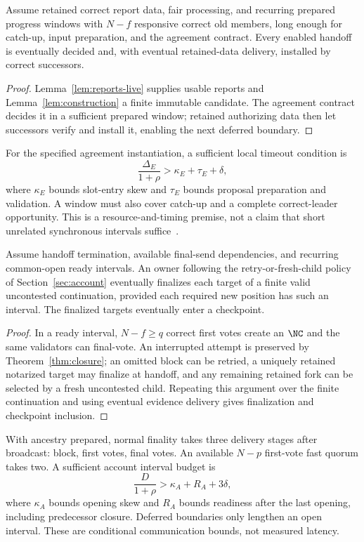 \begin{theorem}
\label{thm:handoff-live}
Assume retained correct report data, fair processing, and recurring prepared progress windows with $N-f$ responsive correct old members, long enough for catch-up, input preparation, and the agreement contract. Every enabled handoff is eventually decided and, with eventual retained-data delivery, installed by correct successors.
\end{theorem}
\begin{proof}
Lemma~\ref{lem:reports-live} supplies usable reports and Lemma~\ref{lem:construction} a finite immutable candidate. The agreement contract decides it in a sufficient prepared window; retained authorizing data then let successors verify and install it, enabling the next deferred boundary.
\end{proof}

For the specified agreement instantiation, a sufficient local timeout condition is
\begin{equation}
\frac{\Delta_E}{1+\rho}>\kappa_E+\tau_E+\delta,\label{eq:election-window}
\end{equation}
where $\kappa_E$ bounds slot-entry skew and $\tau_E$ bounds proposal preparation and validation. A window must also cover catch-up and a complete correct-leader opportunity. This is a resource-and-timing premise, not a claim that short unrelated synchronous intervals suffice~\cite{dls}.

\begin{theorem}
\label{thm:account-live}
Assume handoff termination, available final-send dependencies, and recurring common-open ready intervals. An owner following the retry-or-fresh-child policy of Section~\ref{sec:account} eventually finalizes each target of a finite valid uncontested continuation, provided each required new position has such an interval. The finalized targets eventually enter a checkpoint.
\end{theorem}
\begin{proof}
In a ready interval, $N-f\ge q$ correct first votes create an $\NC$ and the same validators can final-vote. An interrupted attempt is preserved by Theorem~\ref{thm:closure}; an omitted block can be retried, a uniquely retained notarized target may finalize at handoff, and any remaining retained fork can be selected by a fresh uncontested child. Repeating this argument over the finite continuation and using eventual evidence delivery gives finalization and checkpoint inclusion.
\end{proof}

With ancestry prepared, normal finality takes three delivery stages after broadcast: block, first votes, final votes. An available $N-p$ first-vote fast quorum takes two. A sufficient account interval budget is
\begin{equation}
\frac{D}{1+\rho}>\kappa_A+R_A+3\delta,\label{eq:account-window}
\end{equation}
where $\kappa_A$ bounds opening skew and $R_A$ bounds readiness after the last opening, including predecessor closure. Deferred boundaries only lengthen an open interval. These are conditional communication bounds, not measured latency.
